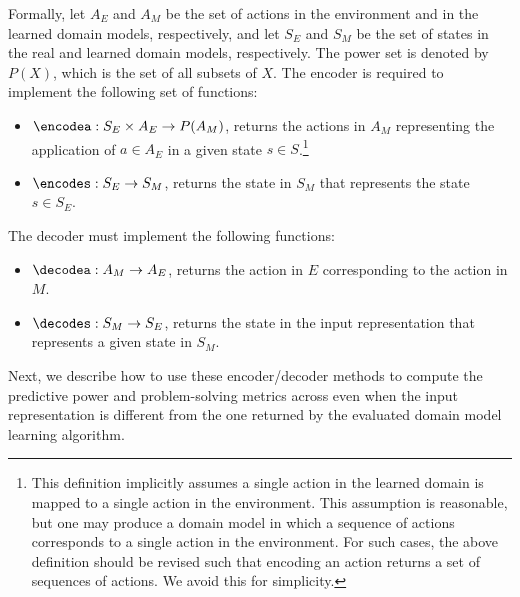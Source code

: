 Formally, let $A_E$ and $A_M$ be the set of actions in the environment and in the learned domain models, respectively, and let $S_E$ and $S_M$ be the set of states in the real and learned domain models, respectively. The power set is denoted by $P(X)$, which is the set of all subsets of $X$. 
The encoder is required to implement the following set of functions:
\begin{itemize}
    \item $\encodea: S_E\times A_E\rightarrow P(A_M)$, returns the actions in $A_M$ representing the application of $a\in A_E$ in a given state $s \in S$.\footnote{This definition implicitly assumes a single action in the learned domain is mapped to a single action in the environment. This assumption is reasonable, but one may produce a domain model in which a sequence of actions corresponds to a single action in the environment. For such cases, the above definition should be revised such that encoding an action returns a set of sequences of actions. We avoid this for simplicity.}
    \item ${\encodes: S_E\rightarrow S_M}$, returns the state in $S_M$ that represents the state $s\in S_E$. 
\end{itemize}
The decoder must implement the following functions:
\begin{itemize}
    \item ${\decodea: A_M\rightarrow A_E}$, returns the action in $E$ corresponding to the action in $M$. 
    \item ${\decodes: S_M\rightarrow S_E}$, returns the state in the input representation that represents a given state in $S_M$. 
\end{itemize}
Next, we describe how to use these encoder/decoder methods to compute the predictive power and problem-solving metrics across even when the input representation is different from the one returned by the evaluated domain model learning algorithm.




    
    

